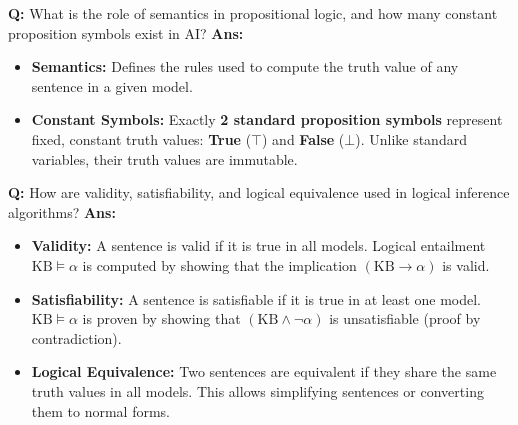 \documentclass[10pt,a4paper,twocolumn]{article}
\begin{document}
\begin{tcolorbox}[
  colback=white,
  colframe=UnitColorSeven,
  colbacktitle=gray!10!white,
  coltitle=black,
  fonttitle=\bfseries\sffamily\small,
  title={Unit VII $\bullet$ Card 8: Proposition Symbols \& Semantics (Q7.4)},
  boxrule=1.2pt,
  arc=2mm,
  outer arc=2mm,
  boxsep=1.5mm,
  top=1mm,
  bottom=1mm,
  left=1.5mm,
  right=1.5mm,
  before skip=2.5mm,
  after skip=2.5mm
]
\textbf{Q:} What is the role of semantics in propositional logic, and how many constant proposition symbols exist in AI?
\tcbline
\textbf{Ans:} \begin{itemize}
  \item   \textbf{Semantics:} Defines the rules used to compute the truth value of any sentence in a given model.
  \item   \textbf{Constant Symbols:} Exactly \textbf{2 standard proposition symbols} represent fixed, constant truth values: \textbf{True} ($\top$) and \textbf{False} ($\bot$). Unlike standard variables, their truth values are immutable.
\end{itemize}
\end{tcolorbox}


\begin{tcolorbox}[
  colback=white,
  colframe=UnitColorSeven,
  colbacktitle=gray!10!white,
  coltitle=black,
  fonttitle=\bfseries\sffamily\small,
  title={Unit VII $\bullet$ Card 9: Logical Inference Properties (Q7.4)},
  boxrule=1.2pt,
  arc=2mm,
  outer arc=2mm,
  boxsep=1.5mm,
  top=1mm,
  bottom=1mm,
  left=1.5mm,
  right=1.5mm,
  before skip=2.5mm,
  after skip=2.5mm
]
\textbf{Q:} How are validity, satisfiability, and logical equivalence used in logical inference algorithms?
\tcbline
\textbf{Ans:} \begin{itemize}
  \item   \textbf{Validity:} A sentence is valid if it is true in all models. Logical entailment $\text{KB} \models \alpha$ is computed by showing that the implication $(\text{KB} \rightarrow \alpha)$ is valid.
  \item   \textbf{Satisfiability:} A sentence is satisfiable if it is true in at least one model. $\text{KB} \models \alpha$ is proven by showing that $(\text{KB} \land \neg \alpha)$ is unsatisfiable (proof by contradiction).
  \item   \textbf{Logical Equivalence:} Two sentences are equivalent if they share the same truth values in all models. This allows simplifying sentences or converting them to normal forms.
\end{itemize}
\end{tcolorbox}
\end{document}
